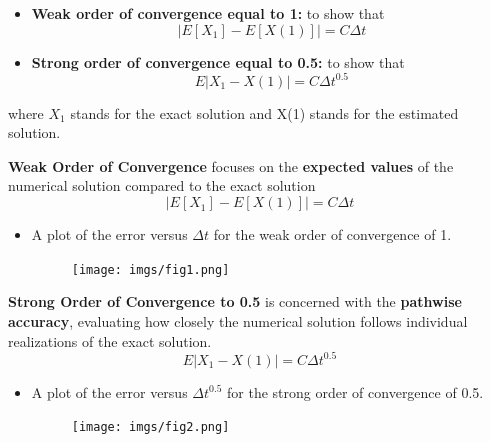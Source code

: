\documentclass{article}
\begin{document}
    \begin{itemize}
        \item \textbf{Weak order of convergence equal to 1:} to show that 
         \[
    |E[X_1]-E[X(1)]|=C\Delta t 
    \]
        \item \textbf{Strong order of convergence equal to 0.5:} to show that
         \[
    E|X_1-X(1)|=C\Delta t^{0.5} 
    \]
    \end{itemize}
    where ${X_1}$ stands for the exact solution and X(1) stands for the estimated solution.
    
\textbf{Weak Order of Convergence} focuses on the \textbf{expected values} of the numerical solution compared to the exact solution
    \[
    |E[X_1]-E[X(1)]|=C\Delta t 
    \]
    
    \begin{itemize}
        \item A plot of the error versus \(\Delta t\) for the  weak order of convergence of 1. 
        \begin{figure}[H]
            \centering
            \texttt{[image: imgs/fig1.png]}
            \label{fig:3a}
       \end{figure}
        
    \end{itemize}
    
\textbf{Strong Order of Convergence to 0.5}  is concerned with the \textbf{pathwise accuracy}, evaluating how closely the numerical solution follows individual realizations of the exact solution.
    \[
    E|X_1-X(1)|=C\Delta t^{0.5} 
    \]
    \begin{itemize}
        \item A plot of the error versus \(\Delta t^{0.5}\) for the  strong order of convergence of 0.5. 
            
             \begin{figure}[H]
            \centering
            \texttt{[image: imgs/fig2.png]}
            \label{fig:3a}
             \end{figure}
                
            
    \end{itemize}
\end{document}
